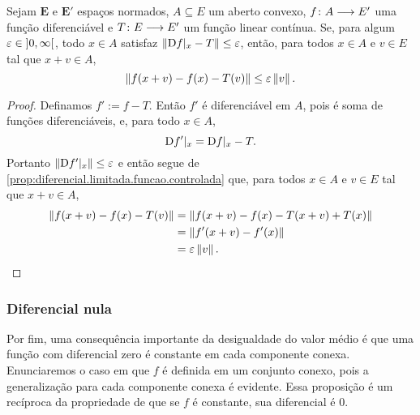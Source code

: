 \begin{proposition}
\label{prop:diferencial.limitada.funcao.controlada.corolario}
Sejam $\bm E$ e $\bm E'$ espaços normados, $A \subseteq E$ um aberto convexo, ${f}\colon {A} \longrightarrow {E'}$ uma função diferenciável e ${T}\colon {E} \longrightarrow {E'}$ um função linear contínua. Se, para algum $\varepsilon \in \left]{0},{\infty}\right[$, todo $x \in A$ satisfaz $\left\Vert{\mathrm{D}f|_x - T}\right\Vert \leq \varepsilon$, então, para todos $x \in A$ e $v \in E$ tal que $x+v \in A$,
	\begin{equation*}
	\left\Vert{f(x+v) - f(x) - T(v)}\right\Vert \leq \varepsilon \left\Vert{v}\right\Vert.
	\end{equation*}
\end{proposition}
\begin{proof}
Definamos $f' := f - T$. Então $f'$ é diferenciável em $A$, pois é soma de funções diferenciáveis, e, para todo $x \in A$,
	\begin{equation*}
	\mathrm{D} f'|_x = \mathrm{D} f|_x - T.
	\end{equation*}
Portanto $\left\Vert{\mathrm{D}f'|_x}\right\Vert \leq \varepsilon$ e então segue de \ref{prop:diferencial.limitada.funcao.controlada} que, para todos $x \in A$ e $v \in E$ tal que $x+v \in A$,
	\begin{align*}
	\left\Vert{f(x+v) - f(x) - T(v)}\right\Vert &= \left\Vert{f(x+v) - f(x) - T(x+v) + T(x)}\right\Vert \\
		&= \left\Vert{f'(x+v) - f'(x)}\right\Vert \\
		&= \varepsilon \left\Vert{v}\right\Vert.
	\qedhere
	\end{align*}
\end{proof}

\subsubsection{Diferencial nula}

Por fim, uma consequência importante da desigualdade do valor médio é que uma função com diferencial zero é constante em cada componente conexa. Enunciaremos o caso em que $f$ é definida em um conjunto conexo, pois a generalização para cada componente conexa é evidente. Essa proposição é um recíproca da propriedade de que se $f$ é constante, sua diferencial é $0$.

